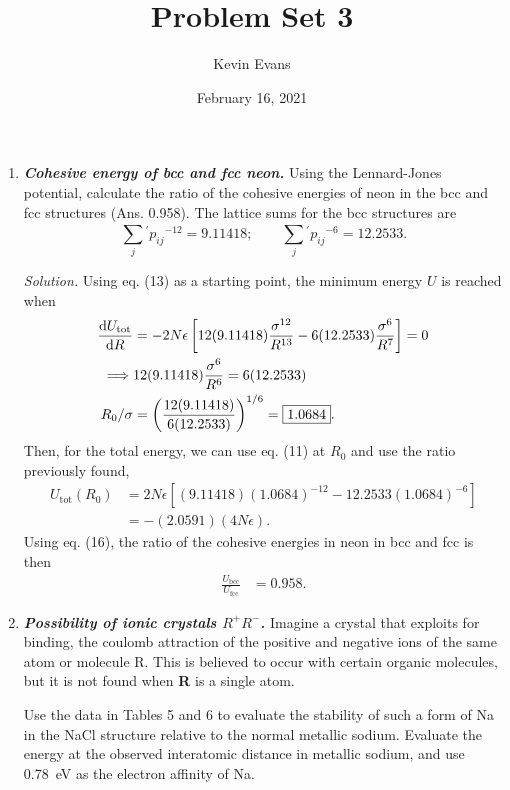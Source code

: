 \documentclass{homework}
\title{Problem Set 3}
\author{Kevin Evans}
\date{February 16, 2021}
\newcommand{\solution}{	\vspace{1em} \textit{Solution.} \quad }
\begin{document}
	\maketitle
	\begin{enumerate}
		\item %
			\textbf{\textit{Cohesive energy of bcc and fcc neon.}} Using the Lennard-Jones potential, calculate the ratio of the cohesive energies of neon in the bcc and fcc structures (Ans. 0.958). The lattice sums for the bcc structures are $$
				\sum_j^{} \phantom{}^{'} {p_{ij}}^{-12} = 9.11418; \qquad \sum_j^{} \phantom{}^{'} {p_{ij}}^{-6} = 12.2533.
			$$
			
			\solution Using eq. (13) as a starting point, the minimum energy $U$ is reached when \begin{align*}
				\dv{U_{\mathrm{tot}}}{R} & = -2 N \epsilon \left[12(9.11418) \frac{\sigma^{12}}{R^{13}}
					-	6(12.2533) \frac{\sigma^6}{R^7}
					\right] = 0 \\
					\implies & 12(9.11418) \frac{\sigma^{6}}{R^{6}} = 6(12.2533) \\
					R_0 / \sigma & = \left(\frac{12(9.11418)}{6(12.2533)}\right)^{1/6} = \boxed{1.0684}.
			\end{align*}
			Then, for the total energy, we can use eq. (11) at $R_0$ and use the ratio previously found, \begin{align*}
				U_{\mathrm{tot}}(R_0) & = 2 N \epsilon \left[
					(9.11418)(1.0684)^{-12} - 12.2533(1.0684)^{-6}
				\right] \\
					& = -(2.0591)(4 N \epsilon).
			\end{align*}
			Using eq. (16), the ratio of the cohesive energies in neon in bcc and fcc is then \begin{align*}
				\frac{U_{\mathrm{bcc}}}{U_{\mathrm{fcc}}} & = \boxed{0.958}.
			\end{align*}
		
		\item %
			\textbf{\textit{Possibility of ionic crystals $R^+ R^-$.}} Imagine a crystal that exploits for binding, the coulomb attraction of the positive and negative ions of the same atom or molecule R. This is believed to occur with certain organic molecules, but it is not found when \textbf{R} is a single atom.
			
			Use the data in Tables 5 and 6 to evaluate the stability of such a form of Na in the NaCl structure relative to the normal metallic sodium. Evaluate the energy at the observed interatomic distance in metallic sodium, and use \SI{0.78}{\eV} as the electron affinity of Na.
			

\end{enumerate}
\end{document}

